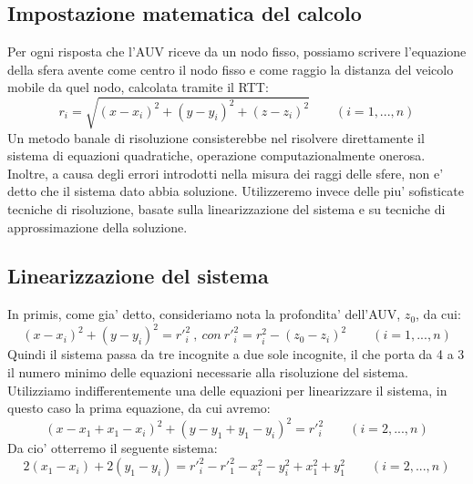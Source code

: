 \documentclass[Lau,binding=0.6cm]{sapthesis}
\begin{document}
\subsection{Impostazione matematica del calcolo}
Per ogni risposta che l'AUV riceve da un nodo fisso, possiamo scrivere l'equazione della sfera avente come centro il nodo fisso e come raggio la distanza del veicolo mobile da quel nodo, calcolata tramite il RTT: \newline
\begin{equation}
r_{i} = \sqrt{(x-x_{i})^2+(y-y_{i})^2+(z-z_{i})^2} \qquad (i = 1,...,n)
\end{equation}
\newline
Un metodo banale di risoluzione consisterebbe nel risolvere direttamente il sistema di equazioni quadratiche, operazione computazionalmente onerosa. Inoltre, a causa degli errori introdotti nella misura dei raggi delle sfere, non e' detto che il sistema dato abbia soluzione.
Utilizzeremo invece delle piu' sofisticate tecniche di risoluzione, basate sulla linearizzazione del sistema e su tecniche di approssimazione della soluzione.\newline

\subsection{Linearizzazione del sistema}
In primis, come gia' detto, consideriamo nota la profondita' dell'AUV, $z_{0}$, da cui:
\begin{equation}
(x-x_{i})^2+(y-y_{i})^2 = r'^2_{i}\ ,\ con\ r'^2_{i} = r^2_{i}-(z_{0}-z_{i})^2 \qquad  (i = 1,...,n)
\end{equation}
\newline
Quindi il sistema passa da tre incognite a due sole incognite, il che porta da 4 a 3 il numero minimo delle equazioni necessarie alla risoluzione del sistema.
Utilizziamo indifferentemente una delle equazioni per linearizzare il sistema, in questo caso la prima equazione, da cui avremo:\newline
\begin{equation}
(x-x_{1}+x_{1}-x_{i})^2+(y-y_{1}+y_{1}-y_{i})^2 =  r'^2_{i} \qquad  (i = 2,...,n)
\end{equation}
\newline
Da cio' otterremo il seguente sistema:\newline
\begin{equation}
2(x_{1}-x_{i})+2(y_{1}-y_{i}) =  r'^2_{i}-r'^2_{1}-x^2_{i}-y^2_{i}+x^2_{1}+y^2_{1} \qquad (i = 2,...,n)
\end{equation}
\end{document}
